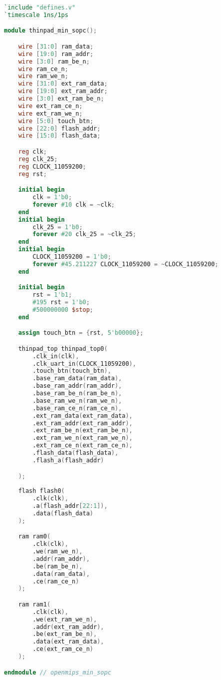 \begin{lstlisting}[language=verilog]
`include "defines.v"
`timescale 1ns/1ps

module thinpad_min_sopc();

    wire [31:0] ram_data;
    wire [19:0] ram_addr;
    wire [3:0] ram_be_n;
    wire ram_ce_n;
    wire ram_we_n;
    wire [31:0] ext_ram_data;
    wire [19:0] ext_ram_addr;
    wire [3:0] ext_ram_be_n;
    wire ext_ram_ce_n;
    wire ext_ram_we_n;
    wire [5:0] touch_btn;
    wire [22:0] flash_addr;
    wire [15:0] flash_data;

    reg clk;
    reg clk_25;
    reg CLOCK_11059200;
    reg rst;

    initial begin
        clk = 1'b0; 
        forever #10 clk = ~clk; 
    end
    initial begin
        clk_25 = 1'b0;
        forever #20 clk_25 = ~clk_25;
    end
    initial begin
        CLOCK_11059200 = 1'b0;
        forever #45.211227 CLOCK_11059200 = ~CLOCK_11059200;
    end

    initial begin
        rst = 1'b1;
        #195 rst = 1'b0;
        #500000000 $stop; 
    end

    assign touch_btn = {rst, 5'b00000};

    thinpad_top thinpad_top0(
        .clk_in(clk),
        .clk_uart_in(CLOCK_11059200),
        .touch_btn(touch_btn),
        .base_ram_data(ram_data),
        .base_ram_addr(ram_addr),
        .base_ram_be_n(ram_be_n),
        .base_ram_we_n(ram_we_n),
        .base_ram_ce_n(ram_ce_n),
        .ext_ram_data(ext_ram_data),
        .ext_ram_addr(ext_ram_addr),
        .ext_ram_be_n(ext_ram_be_n),
        .ext_ram_we_n(ext_ram_we_n),
        .ext_ram_ce_n(ext_ram_ce_n),
        .flash_data(flash_data),
        .flash_a(flash_addr)

    );
    
    flash flash0(
        .clk(clk),
        .a(flash_addr[22:1]),
        .data(flash_data)
    );

    ram ram0(
        .clk(clk),
        .we(ram_we_n),
        .addr(ram_addr),
        .be(ram_be_n),
        .data(ram_data),
        .ce(ram_ce_n)   
    );

    ram ram1(
        .clk(clk),
        .we(ext_ram_we_n),
        .addr(ext_ram_addr),
        .be(ext_ram_be_n),
        .data(ext_ram_data),
        .ce(ext_ram_ce_n)      
    );

endmodule // openmips_min_sopc
\end{lstlisting}

